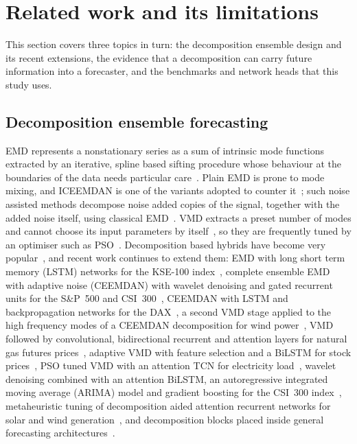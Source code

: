 \documentclass[pdflatex,sn-mathphys-num]{sn-jnl}%
\theoremstyle{thmstyleone}%
\theoremstyle{thmstyletwo}%
\theoremstyle{thmstylethree}%
\begin{document}
\section{Related work and its limitations}\label{sec:related}

This section covers three topics in turn: the decomposition ensemble design
and its recent extensions, the evidence that a decomposition can carry future
information into a forecaster, and the benchmarks and network heads that this
study uses.

\subsection{Decomposition ensemble forecasting}
EMD represents a nonstationary series as a sum of intrinsic mode functions
extracted by an iterative, spline based sifting procedure whose behaviour at
the boundaries of the data needs particular care~\cite{emdtutorial2023}. Plain
EMD is prone to mode mixing, and ICEEMDAN is one of the variants adopted to
counter it~\cite{iceemdanbridge2022}; such noise assisted methods decompose
noise added copies of the signal, together with the added noise itself, using
classical EMD~\cite{ceemdanpaa2022}. VMD extracts a preset number of modes and
cannot choose its input parameters by itself~\cite{vmdmssr2022}, so they are
frequently tuned by an optimiser such as PSO~\cite{psovmdtcn2023}.
Decomposition based hybrids have become very popular~\cite{chen2022}, and
recent work continues to extend them: EMD with long short term memory (LSTM)
networks for the KSE-100 index~\cite{akimaemd2023}, complete ensemble EMD with
adaptive noise (CEEMDAN) with wavelet denoising and gated recurrent units for
the S\&P~500 and CSI~300~\cite{gruceemdan2023}, CEEMDAN with LSTM and
backpropagation networks for the DAX~\cite{ceemdanstock2025}, a second VMD
stage applied to the high frequency modes of a CEEMDAN decomposition for wind
power~\cite{ning2025}, VMD followed by convolutional, bidirectional recurrent
and attention layers for natural gas futures prices~\cite{jiang2025}, adaptive
VMD with feature selection and a BiLSTM for stock prices~\cite{wangwang2026},
PSO tuned VMD with an attention TCN for electricity load~\cite{psovmdtcn2023},
wavelet denoising combined with an attention BiLSTM, an autoregressive
integrated moving average (ARIMA) model and gradient boosting for the CSI~300
index~\cite{zhao2025}, metaheuristic tuning of decomposition aided attention
recurrent networks for solar and wind generation~\cite{damasevicius2024}, and
decomposition blocks placed inside general forecasting
architectures~\cite{kreuzer2025}.
\end{document}
